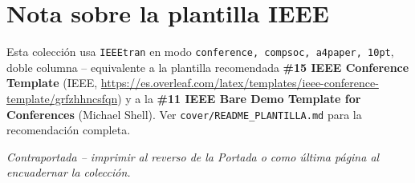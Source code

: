 \documentclass[a4paper,12pt]{article}
\begin{document}
\section*{Nota sobre la plantilla IEEE}
Esta colección usa \texttt{IEEEtran} en modo \texttt{conference, compsoc, a4paper, 10pt}, doble columna -- equivalente a la plantilla recomendada \textbf{\#15 IEEE Conference Template} (IEEE, \url{https://es.overleaf.com/latex/templates/ieee-conference-template/grfzhhncsfqn}) y a la \textbf{\#11 IEEE Bare Demo Template for Conferences} (Michael Shell). Ver \texttt{cover/README\_PLANTILLA.md} para la recomendación completa.

\vfill
\begin{center}
{\footnotesize \textit{Contraportada -- imprimir al reverso de la Portada o como última página al encuadernar la colección.}}\\
\end{center}
\end{document}
